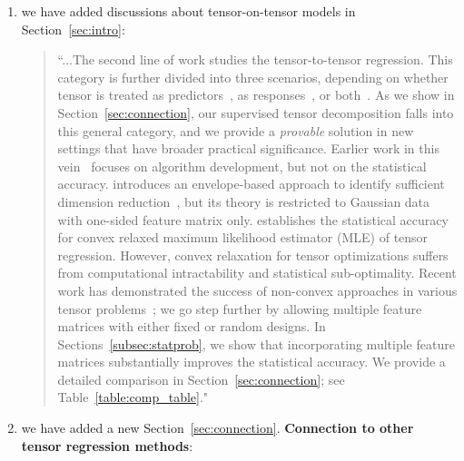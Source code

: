\documentclass[11pt]{article}
\theoremstyle{plain}
\theoremstyle{definition}
\begin{document}
\begin{enumerate}[wide, labelwidth=!, labelindent=0pt]
\begin{enumerate}[wide, labelwidth=!, labelindent=0pt]
        \item we have added discussions about tensor-on-tensor models in Section~\ref{sec:intro}: 
        \begin{quote}
            ``...The second line of work studies the tensor-to-tensor regression. This category is further divided into three scenarios, depending on whether tensor is treated as predictors~\citep{zhou2013tensor,raskutti2019convex,han2020optimal}, as responses~\citep{li2017parsimonious,sun2017store,zhang2018network,lock2018supervised,luo2018leveraging}, or both~\citep{lock2018tensor,gahrooei2020multiple}. As we show in Section~\ref{sec:connection}, our supervised tensor decomposition falls into this general category, and we provide a \emph{provable} solution in new settings that have broader practical significance. Earlier work in this vein~\citep{lock2018tensor,lock2018supervised,gahrooei2020multiple,li2020generalized} focuses on algorithm development, but not on the statistical accuracy. \cite{li2017parsimonious} introduces an envelope-based approach to identify sufficient dimension reduction~\citep{adragni2009sufficient}, but its theory is restricted to Gaussian data with one-sided feature matrix only. \cite{raskutti2019convex} establishes the statistical accuracy for convex relaxed maximum likelihood estimator (MLE) of tensor regression. However, convex relaxation for tensor optimizations suffers from computational intractability and statistical sub-optimality. Recent work has demonstrated the success of non-convex approaches in various tensor problems~\citep{sun2017store,zhang2018network,raskutti2019convex,han2020optimal}; we go step further by allowing multiple feature matrices with either fixed or random designs. In Sections~\ref{subsec:statprob}, we show that incorporating multiple feature matrices substantially improves the statistical accuracy. We provide a detailed comparison in Section~\ref{sec:connection}; see Table~\ref{table:comp_table}."
        \end{quote}
        
      
        
 \item we have added a new Section~\ref{sec:connection}. \textbf{Connection to other tensor regression methods}:
        

\end{enumerate}
\end{enumerate}
\end{document}
